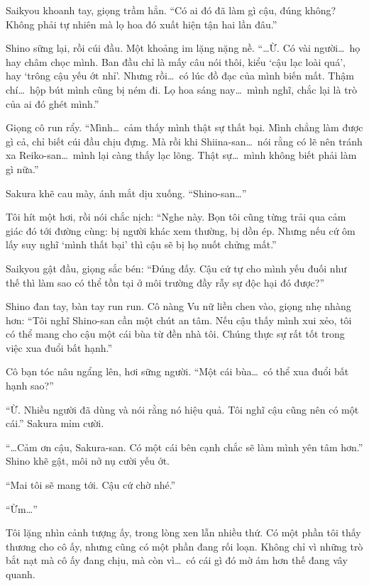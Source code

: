 \documentclass[../main.tex]{subfiles}
\begin{document}
Saikyou khoanh tay, giọng trầm hẳn. ``Có ai đó đã làm gì cậu, đúng không? Không phải tự nhiên mà lọ hoa đó xuất hiện tận hai lần đâu.''

Shino sững lại, rồi cúi đầu. Một khoảng im lặng nặng nề. ``\dots Ừ. Có vài người\dots\ họ hay châm chọc mình. Ban đầu chỉ là mấy câu nói thôi, kiểu `cậu lạc loài quá', hay `trông cậu yếu ớt nhỉ'. Nhưng rồi\dots\ có lúc đồ đạc của mình biến mất. Thậm chí\dots\ hộp bút mình cũng bị ném đi. Lọ hoa sáng nay\dots\ mình nghĩ, chắc lại là trò của ai đó ghét mình.''

Giọng cô run rẩy. ``Mình\dots\ cảm thấy mình thật sự thất bại. Mình chẳng làm được gì cả, chỉ biết cúi đầu chịu đựng. Mà rồi khi Shiina-san\dots\ nói rằng có lẽ nên tránh xa Reiko-san\dots\ mình lại càng thấy lạc lõng. Thật sự\dots\ mình không biết phải làm gì nữa.''

Sakura khẽ cau mày, ánh mắt dịu xuống. ``Shino-san\dots''

Tôi hít một hơi, rồi nói chắc nịch: ``Nghe này. Bọn tôi cũng từng trải qua cảm giác đó tới đường cùng: bị người khác xem thường, bị dồn ép. Nhưng nếu cứ ôm lấy suy nghĩ `mình thất bại' thì cậu sẽ bị họ nuốt chửng mất.''

Saikyou gật đầu, giọng sắc bén: ``Đúng đấy. Cậu cứ tự cho mình yếu đuối như thế thì làm sao có thể tồn tại ở môi trường đầy rẫy sự độc hại đó được?''

Shino đan tay, bàn tay run run. Cô nàng Vu nữ liền chen vào, giọng nhẹ nhàng hơn: ``Tôi nghĩ Shino-san cần một chút an tâm. Nếu cậu thấy mình xui xẻo, tôi có thể mang cho cậu một cái bùa từ đền nhà tôi. Chúng thực sự rất tốt trong việc xua đuổi bất hạnh.''

Cô bạn tóc nâu ngẩng lên, hơi sững người. ``Một cái bùa\dots\ có thể xua đuổi bất hạnh sao?''

``Ừ. Nhiều người đã dùng và nói rằng nó hiệu quả. Tôi nghĩ cậu cũng nên có một cái.'' Sakura mỉm cười.

``\dots Cảm ơn cậu, Sakura-san. Có một cái bên cạnh chắc sẽ làm mình yên tâm hơn.'' Shino khẽ gật, môi nở nụ cười yếu ớt.

``Mai tôi sẽ mang tới. Cậu cứ chờ nhé.''

``Ừm\dots''

Tôi lặng nhìn cảnh tượng ấy, trong lòng xen lẫn nhiều thứ. Có một phần tôi thấy thương cho cô ấy, nhưng cũng có một phần đang rối loạn. Không chỉ vì những trò bắt nạt mà cô ấy đang chịu, mà còn vì\dots\ có cái gì đó mờ ám hơn thế đang vây quanh.
\end{document}
